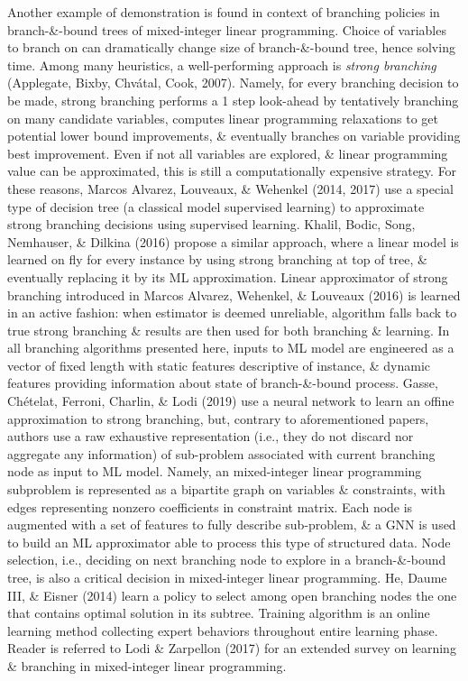 \documentclass{article}
\begin{document}
\begin{itemize}
\begin{itemize}
\begin{itemize}
            Another example of demonstration is found in context of branching policies in branch-\&-bound trees of mixed-integer linear programming. Choice of variables to branch on can dramatically change size of branch-\&-bound tree, hence solving time. Among many heuristics, a well-performing approach is {\it strong branching} (Applegate, Bixby, Chvátal,  Cook, 2007). Namely, for every branching decision to be made, strong branching performs a 1 step look-ahead by tentatively branching on many candidate variables, computes linear programming relaxations to get potential lower bound improvements, \& eventually branches on variable providing best improvement. Even if not all variables are explored, \& linear programming value can be approximated, this is still a computationally expensive strategy. For these reasons, Marcos Alvarez, Louveaux, \& Wehenkel (2014, 2017) use a special type of decision tree (a classical model supervised learning) to approximate strong branching decisions using supervised learning. Khalil, Bodic, Song, Nemhauser, \& Dilkina (2016) propose a similar approach, where a linear model is learned on fly for every instance by using strong branching at top of tree, \& eventually replacing it by its ML approximation. Linear approximator of strong branching introduced in Marcos Alvarez, Wehenkel, \& Louveaux (2016) is learned in an active fashion: when estimator is deemed unreliable, algorithm falls back to true strong branching \& results are then used for both branching \& learning. In all branching algorithms presented here, inputs to ML model are engineered as a vector of fixed length with static features descriptive of instance, \& dynamic features providing information about state of branch-\&-bound process. Gasse, Chételat, Ferroni, Charlin, \& Lodi (2019) use a neural network to learn an offine approximation to strong branching, but, contrary to aforementioned papers, authors use a raw exhaustive representation (i.e., they do not discard nor aggregate any information) of sub-problem associated with current branching node as input to ML model. Namely, an mixed-integer linear programming subproblem is represented as a bipartite graph on variables \& constraints, with edges representing nonzero coefficients in constraint matrix. Each node is augmented with a set of features to fully describe sub-problem, \& a GNN is used to build an ML approximator able to process this type of structured data. Node selection, i.e., deciding on next branching node to explore in a branch-\&-bound tree, is also a critical decision in mixed-integer linear programming. He, Daume III, \& Eisner (2014) learn a policy to select among open branching nodes the one that contains optimal solution in its subtree. Training algorithm is an online learning method collecting expert behaviors throughout entire learning phase. Reader is referred to Lodi \& Zarpellon (2017) for an extended survey on learning \& branching in mixed-integer linear programming.


\end{itemize}
\end{itemize}
\end{itemize}
\end{document}
